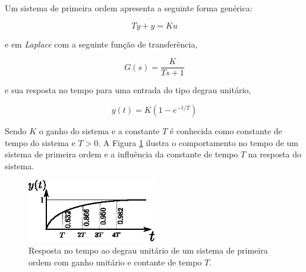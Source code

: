 Um sistema de primeira ordem apresenta a seguinte forma genérica:

\begin{equation}
    T\dot{y} + y = Ku
\end{equation}

e em \emph{Laplace} com a seguinte função de transferência,

\begin{equation}
    G(s) = \frac{K}{Ts + 1}
\end{equation}

e sua resposta no tempo para uma entrada do tipo degrau unitário,

\begin{equation}
    y(t) = K \left(1 - e^{-t/T} \right)
\end{equation}

Sendo $K$ o ganho do sistema e a constante $T$ é conhecida como constante de tempo do sistema e $T > 0$. A Figura \ref{fig:saida_sistema_primeira_ordem_no_tempo} ilustra o comportamento no tempo de um sistema de primeira ordem e a influência da constante de tempo $T$ na resposta do sistema.

\begin{figure}[H]
    \centering
    \includegraphics[width=0.5\textwidth]{figuras/ilustracoes/resposta_no_tempo_sistema_primeira_ordem.eps}
    \caption{Resposta no tempo ao degrau unitário de um sistema de primeira ordem com ganho unitário e contante de tempo $T$.}
    \label{fig:saida_sistema_primeira_ordem_no_tempo}
\end{figure}

